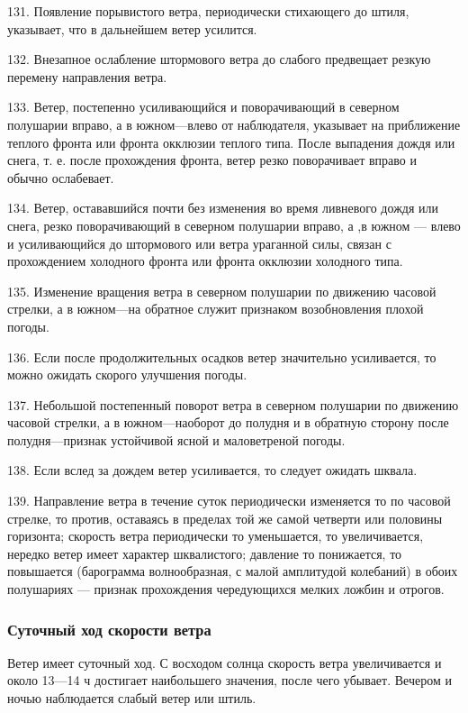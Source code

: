 131. Появление порывистого ветра, периодически стихающего до штиля, указывает, что в дальнейшем ветер усилится.

132. Внезапное ослабление штормового ветра до слабого предвещает резкую перемену направления ветра.

133. Ветер, постепенно усиливающийся и поворачивающий в северном полушарии вправо, а в южном—влево от наблюдателя, указывает на приближение теплого фронта или фронта окклюзии теплого типа. После выпадения дождя или снега, т. е. после прохождения фронта, ветер резко поворачивает вправо и обычно ослабевает.

134. Ветер, остававшийся почти без изменения во время ливневого дождя или снега, резко поворачивающий в северном полушарии вправо, а ,в южном — влево и усиливающийся до штормового или ветра ураганной силы, связан с прохождением холодного фронта или фронта окклюзии холодного типа.

135. Изменение вращения ветра в северном полушарии по движению часовой стрелки, а в южном—на обратное служит признаком возобновления плохой погоды.

136. Если после продолжительных осадков ветер значительно усиливается, то можно ожидать скорого улучшения погоды.

137. Небольшой постепенный поворот ветра в северном полушарии по движению часовой стрелки, а в южном—наоборот до полудня и в обратную сторону после полудня—признак устойчивой ясной и маловетреной погоды.

138. Если вслед за дождем ветер усиливается, то следует ожидать шквала.

139. Направление ветра в течение суток периодически изменяется то по часовой стрелке, то против, оставаясь в пределах той же самой четверти или половины горизонта; скорость ветра периодически то уменьшается, то увеличивается, нередко ветер имеет характер шквалистого; давление то понижается, то повышается (барограмма волнообразная, с малой амплитудой колебаний) в обоих полушариях — признак прохождения чередующихся мелких ложбин и отрогов.

\subsubsection{Суточный ход скорости ветра}

Ветер имеет суточный ход. С восходом солнца скорость ветра увеличивается и около 13—14 ч достигает наибольшего значения, после чего убывает. Вечером и ночью наблюдается слабый ветер или штиль.

